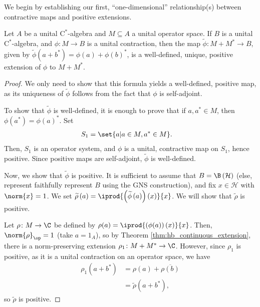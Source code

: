 We begin by establishing our first, ``one-dimensional'' relationship(s) between contractive maps and positive extensions.
\begin{proposition}\label{prop:extension_of_contractions}
  Let $A$ be a unital $\mathrm{C}^{\ast}$-algebra and $M\subseteq A$ a unital operator space. If $B$ is a unital $\mathrm{C}^{\ast}$-algebra, and $\phi\colon M\rightarrow B$ is a unital contraction, then the map $\widetilde{\phi}\colon M + M^{\ast}\rightarrow B$, given by $\widetilde{\phi}\left( a + b^{\ast} \right) = \phi\left( a \right) + \phi\left( b \right)^{\ast}$, is a well-defined, unique, positive extension of $\phi$ to $M + M^{\ast}$.
\end{proposition}
\begin{proof}
  We only need to show that this formula yields a well-defined, positive map, as its uniqueness of $\widetilde{\phi}$ follows from the fact that $\phi$ is self-adjoint.\newline

  To show that $\widetilde{\phi}$ is well-defined, it is enough to prove that if $a,a^{\ast}\in M$, then $\phi\left( a^{\ast} \right) = \phi\left( a \right)^{\ast}$. Set
  \begin{align*}
    S_1 &= \set{a | a\in M,a^{\ast}\in M}.
  \end{align*}
  Then, $S_1$ is an operator system, and $\phi$ is a unital, contractive map on $S_1$, hence positive. Since positive maps are self-adjoint, $\widetilde{\phi}$ is well-defined.\newline

  Now, we show that $\widetilde{\phi}$ is positive. It is sufficient to assume that $B = \B\left( \mathcal{H} \right)$ (else, represent faithfully represent $B$ using the GNS construction), and fix $x\in \mathcal{H}$ with $\norm{x} = 1$. We set $\widetilde{\rho}\left( a \right) = \iprod{\left( \widetilde{\phi}\left( a \right) \right)(x)}{x}$. We will show that $\widetilde{\rho}$ is positive.\newline

  Let $\rho\colon M\rightarrow \C$ be defined by $\rho(a) = \iprod{\left( \phi(a) \right)(x)}{x}$. Then, $\norm{\rho}_{\op} = 1$ (take $a = 1_A$), so by Theorem \ref{thm:hb_continuous_extension}, there is a norm-preserving extension $\rho_1\colon M + M^{\ast}\rightarrow \C$. However, since $\rho_1$ is positive, as it is a unital contraction on an operator space, we have
  \begin{align*}
    \rho_1\left( a + b^{\ast} \right) &= \rho\left( a \right) + \overline{\rho\left( b \right)}\\
                                      &= \widetilde{\rho}\left( a + b^{\ast} \right),
  \end{align*}
  so $\widetilde{\rho}$ is positive.
\end{proof}
